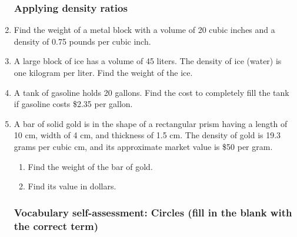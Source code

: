 \documentclass[12pt, twoside]{article}
\begin{document}
\begin{enumerate}
\newpage
\subsubsection*{Applying density ratios}
\item Find the weight of a metal block with a volume of 20 cubic inches and a density of 0.75 pounds per cubic inch. \vspace{3cm}
\item A large block of ice has a volume of 45 liters. The density of ice (water) is one kilogram per liter. Find the weight of the ice.  \vspace{3cm}
\item A tank of gasoline holds 20 gallons. Find the cost to completely fill the tank if gasoline costs \$2.35 per gallon. \vspace{3cm}
\item A bar of solid gold is in the shape of a rectangular prism having a length of 10 cm, width of 4 cm, and thickness of 1.5 cm. The density of gold is 19.3 grams per cubic cm, and its approximate market value is \$50 per gram.
\begin{enumerate}
  \item Find the weight of the bar of gold.  \vspace{3cm}
  \item Find its value in dollars.
\end{enumerate}

\newpage
\subsubsection*{Vocabulary self-assessment: Circles (fill in the blank with the correct term)}


\end{enumerate}
\end{document}
